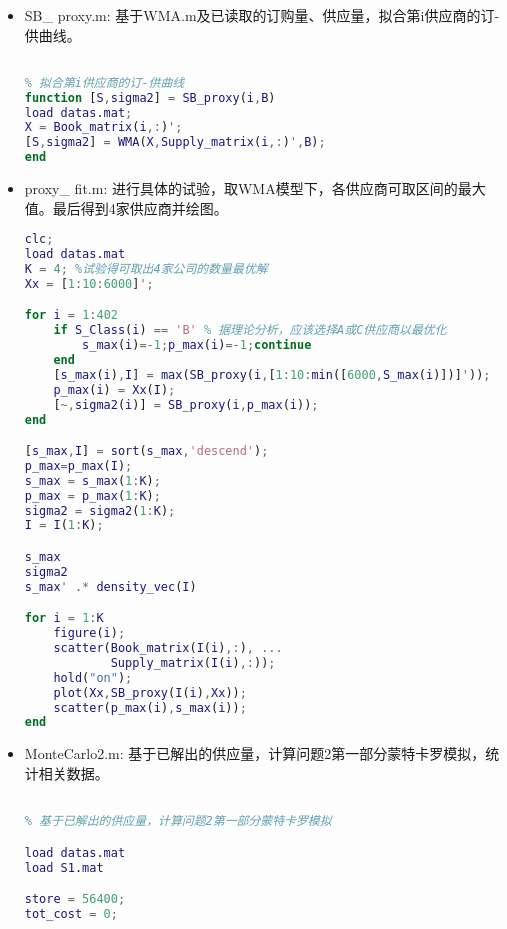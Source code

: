 \documentclass{my_paper}
\begin{document}
\begin{itemize}
\begin{lstlisting}[language={Matlab}]
\end{lstlisting}

\item SB\_ proxy.m: 基于WMA.m及已读取的订购量、供应量，拟合第i供应商的订-供曲线。

\begin{lstlisting}[language={Matlab}]

% 拟合第i供应商的订-供曲线
function [S,sigma2] = SB_proxy(i,B)
load datas.mat;
X = Book_matrix(i,:)';
[S,sigma2] = WMA(X,Supply_matrix(i,:)',B);
end

\end{lstlisting}

\item proxy\_ fit.m: 进行具体的试验，取WMA模型下，各供应商可取区间的最大值。最后得到4家供应商并绘图。

\begin{lstlisting}[language={Matlab}]
clc;
load datas.mat
K = 4; %试验得可取出4家公司的数量最优解
Xx = [1:10:6000]'; 

for i = 1:402
    if S_Class(i) == 'B' % 据理论分析，应该选择A或C供应商以最优化
        s_max(i)=-1;p_max(i)=-1;continue
    end
    [s_max(i),I] = max(SB_proxy(i,[1:10:min([6000,S_max(i)])]'));
    p_max(i) = Xx(I);
    [~,sigma2(i)] = SB_proxy(i,p_max(i));
end

[s_max,I] = sort(s_max,'descend');
p_max=p_max(I);
s_max = s_max(1:K);
p_max = p_max(1:K);
sigma2 = sigma2(1:K);
I = I(1:K);

s_max
sigma2
s_max' .* density_vec(I)

for i = 1:K
    figure(i);
    scatter(Book_matrix(I(i),:), ...
            Supply_matrix(I(i),:));
    hold("on");
    plot(Xx,SB_proxy(I(i),Xx));
    scatter(p_max(i),s_max(i));
end
\end{lstlisting}

\item MonteCarlo2.m: 基于已解出的供应量，计算问题2第一部分蒙特卡罗模拟，统计相关数据。

\begin{lstlisting}[language={Matlab}]

% 基于已解出的供应量，计算问题2第一部分蒙特卡罗模拟

load datas.mat
load S1.mat

store = 56400;
tot_cost = 0;


\end{lstlisting}
\end{itemize}
\end{document}
